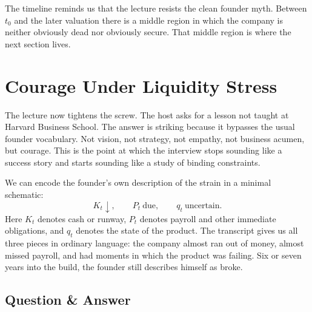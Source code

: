 \begin{figure}
\centering
{}
\end{figure}

The timeline reminds us that the lecture resists the clean founder myth. Between \(t_0\) and the later valuation there is a middle region in which the company is neither obviously dead nor obviously secure. That middle region is where the next section lives.

\section{Courage Under Liquidity Stress}

The lecture now tightens the screw. The host asks for a lesson not taught at Harvard Business School. The answer is striking because it bypasses the usual founder vocabulary. Not vision, not strategy, not empathy, not business acumen, but courage. This is the point at which the interview stops sounding like a success story and starts sounding like a study of binding constraints.

We can encode the founder's own description of the strain in a minimal schematic:
\begin{equation}
K_t \downarrow,
\qquad
P_t\ \text{due},
\qquad
q_t\ \text{uncertain}.
\end{equation}
Here \(K_t\) denotes cash or runway, \(P_t\) denotes payroll and other immediate obligations, and \(q_t\) denotes the state of the product. The transcript gives us all three pieces in ordinary language: the company almost ran out of money, almost missed payroll, and had moments in which the product was failing. Six or seven years into the build, the founder still describes himself as broke.

\subsection{Question \& Answer}

